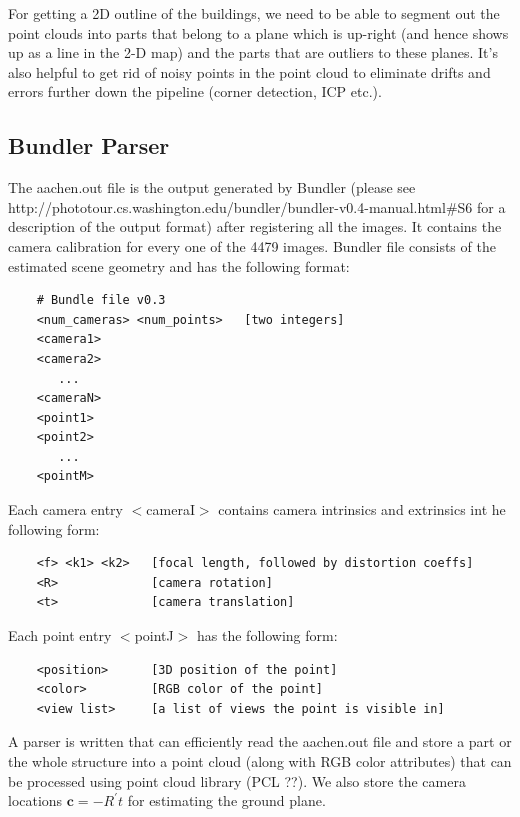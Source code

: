 \documentclass[10pt,twocolumn,letterpaper]{article}
\begin{document}
For getting a 2D outline of the buildings, we need to be able to segment out the point clouds into parts that belong to a plane which is up-right (and hence shows up as a line in the 2-D map) and the parts that are outliers to these planes. It's also helpful to get rid of noisy points in the point cloud to eliminate drifts and errors further down the pipeline (corner detection, ICP etc.). 

\subsection{Bundler Parser}
The aachen.out file is the output generated by Bundler (please see http://phototour.cs.washington.edu/bundler/bundler-v0.4-manual.html\#S6 for a description of the output format) after registering all the images. It contains the camera calibration for every one of the 4479 images. Bundler file consists of the estimated scene geometry and has the following format:

{\scriptsize
\begin{verbatim}
    # Bundle file v0.3
    <num_cameras> <num_points>   [two integers]
    <camera1>
    <camera2>
       ...
    <cameraN>
    <point1>
    <point2>
       ...
    <pointM>
\end{verbatim}
}

Each camera entry $<$cameraI$>$ contains camera intrinsics and extrinsics int he following form:

{\scriptsize
\begin{verbatim}
    <f> <k1> <k2>   [focal length, followed by distortion coeffs]
    <R>             [camera rotation]
    <t>             [camera translation]
\end{verbatim}
}

Each point entry $<$pointJ$>$ has the following form:

{\scriptsize
\begin{verbatim}
    <position>      [3D position of the point]
    <color>         [RGB color of the point]
    <view list>     [a list of views the point is visible in]
\end{verbatim}
}

A parser is written that can efficiently read the aachen.out file and store a part or the whole structure into a point cloud (along with RGB color attributes) that can be processed using point cloud library (PCL ??). We also store the camera locations $\textbf{c} = -R^{'}t$ for estimating the ground plane.
\end{document}
